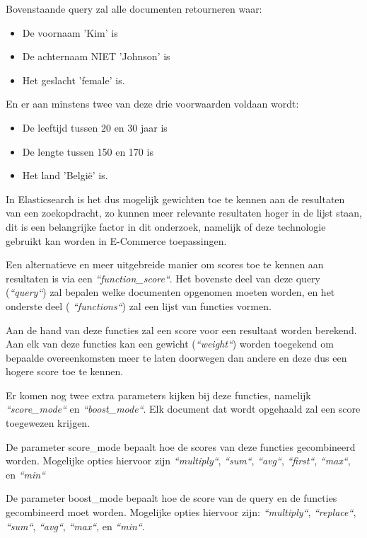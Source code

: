 Bovenstaande query zal alle documenten retourneren waar: 
\begin{itemize}
	\setlength\itemsep{.3em}
	\item De voornaam 'Kim' is
	\item De achternaam NIET 'Johnson' is
	\item Het geslacht 'female' is.
\end{itemize}

En er aan minstens twee van deze drie voorwaarden voldaan wordt: 
\begin{itemize}
	\setlength\itemsep{.3em}
	\item De leeftijd tussen 20 en 30 jaar is
	\item De lengte tussen 150 en 170 is
	\item Het land 'België' is.
\end{itemize}



In Elasticsearch is het dus mogelijk gewichten toe te kennen aan de resultaten van een zoekopdracht, zo kunnen meer relevante resultaten hoger in de lijst staan, dit is een belangrijke factor in dit onderzoek, namelijk of deze technologie gebruikt kan worden in E-Commerce toepassingen.

Een alternatieve en meer uitgebreide manier om scores toe te kennen aan resultaten is via een \textit{``function\_score``}. Het bovenste deel van deze query (\textit{``query``}) zal bepalen welke documenten opgenomen moeten worden, en het onderste deel ( \textit{``functions``}) zal een lijst van functies vormen. 

Aan de hand van deze functies zal een score voor een resultaat worden berekend. Aan elk van deze functies kan een gewicht (\textit{``weight``}) worden toegekend om bepaalde overeenkomsten meer te laten doorwegen dan andere en deze dus een hogere score toe te kennen.

Er komen nog twee extra parameters kijken bij deze functies, namelijk \textit{``score\_mode``} en \textit{``boost\_mode``}. Elk document dat wordt opgehaald zal een score toegewezen krijgen. 

De parameter score\_mode bepaalt hoe de scores  van deze functies gecombineerd worden. Mogelijke opties hiervoor zijn \textit{``multiply``}, \textit{``sum``}, \textit{``avg``}, \textit{``first``}, \textit{``max``}, en \textit{``min``}

De parameter boost\_mode bepaalt hoe de score van de query en de functies gecombineerd moet worden. Mogelijke opties hiervoor zijn: \textit{``multiply``}, \textit{``replace``}, \textit{``sum``}, \textit{``avg``}, \textit{``max``}, en \textit{``min``}.


